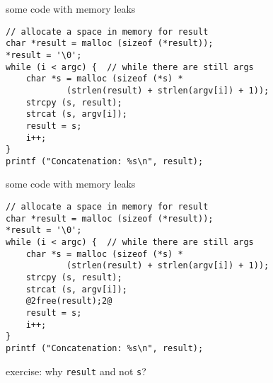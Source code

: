 \begin{frame}[fragile,label=memLeakCode]{some code with memory leaks}
\lstset{language=C++,style=smaller}
\begin{lstlisting}
// allocate a space in memory for result
char *result = malloc (sizeof (*result));
*result = '\0';
while (i < argc) {  // while there are still args
    char *s = malloc (sizeof (*s) *
            (strlen(result) + strlen(argv[i]) + 1));
    strcpy (s, result);
    strcat (s, argv[i]);
    result = s;
    i++;
}
printf ("Concatenation: %s\n", result);
\end{lstlisting}
\end{frame}


\begin{frame}[fragile,label=memLeakCodeFixed]{some code with memory leaks}
\begin{lstlisting}
// allocate a space in memory for result
char *result = malloc (sizeof (*result));
*result = '\0';
while (i < argc) {  // while there are still args
    char *s = malloc (sizeof (*s) *
            (strlen(result) + strlen(argv[i]) + 1));
    strcpy (s, result);
    strcat (s, argv[i]);
    @2free(result);2@
    result = s;
    i++;
}
printf ("Concatenation: %s\n", result);
\end{lstlisting}
exercise: why \texttt{result} and not \texttt{s}?
\end{frame}
